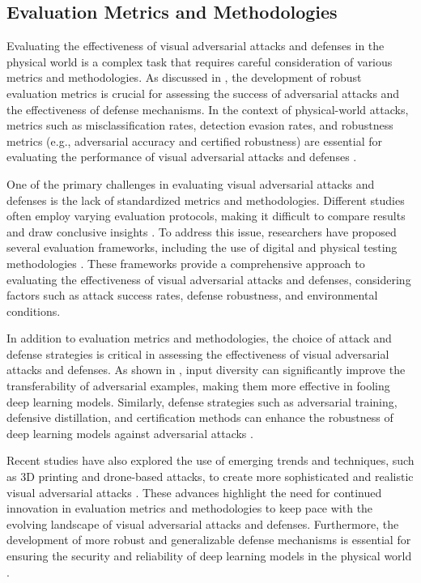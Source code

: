 \documentclass[11pt,a4paper]{article}
\begin{document}
\subsection{Evaluation Metrics and Methodologies}


Evaluating the effectiveness of visual adversarial attacks and defenses in the physical world is a complex task that requires careful consideration of various metrics and methodologies. As discussed in \cite{doi:10.1145/3128572.3140444}, the development of robust evaluation metrics is crucial for assessing the success of adversarial attacks and the effectiveness of defense mechanisms. In the context of physical-world attacks, metrics such as misclassification rates, detection evasion rates, and robustness metrics (e.g., adversarial accuracy and certified robustness) are essential for evaluating the performance of visual adversarial attacks and defenses \cite{arxiv:1707.08945}.

One of the primary challenges in evaluating visual adversarial attacks and defenses is the lack of standardized metrics and methodologies. Different studies often employ varying evaluation protocols, making it difficult to compare results and draw conclusive insights \cite{doi:10.1109/access.2018.2807385}. To address this issue, researchers have proposed several evaluation frameworks, including the use of digital and physical testing methodologies \cite{doi:10.3390/bdcc8010008}. These frameworks provide a comprehensive approach to evaluating the effectiveness of visual adversarial attacks and defenses, considering factors such as attack success rates, defense robustness, and environmental conditions.

In addition to evaluation metrics and methodologies, the choice of attack and defense strategies is critical in assessing the effectiveness of visual adversarial attacks and defenses. As shown in \cite{doi:10.1109/cvpr.2019.00284}, input diversity can significantly improve the transferability of adversarial examples, making them more effective in fooling deep learning models. Similarly, defense strategies such as adversarial training, defensive distillation, and certification methods can enhance the robustness of deep learning models against adversarial attacks \cite{arxiv:1803.00404}.

Recent studies have also explored the use of emerging trends and techniques, such as 3D printing and drone-based attacks, to create more sophisticated and realistic visual adversarial attacks \cite{arxiv:1907.05418}. These advances highlight the need for continued innovation in evaluation metrics and methodologies to keep pace with the evolving landscape of visual adversarial attacks and defenses. Furthermore, the development of more robust and generalizable defense mechanisms is essential for ensuring the security and reliability of deep learning models in the physical world \cite{doi:10.3390/electronics10172132}.
\end{document}
